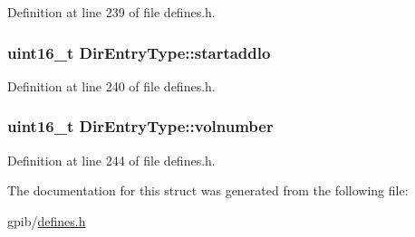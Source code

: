 Definition at line 239 of file defines.\+h.

\subsubsection[{\texorpdfstring{startaddlo}{startaddlo}}]{\setlength{\rightskip}{0pt plus 5cm}uint16\+\_\+t Dir\+Entry\+Type\+::startaddlo}\hypertarget{structDirEntryType_aea0e798bb172b4bddf174ce339a4a54a}{}\label{structDirEntryType_aea0e798bb172b4bddf174ce339a4a54a}


Definition at line 240 of file defines.\+h.

\subsubsection[{\texorpdfstring{volnumber}{volnumber}}]{\setlength{\rightskip}{0pt plus 5cm}uint16\+\_\+t Dir\+Entry\+Type\+::volnumber}\hypertarget{structDirEntryType_add9ab11f89586efb100471f6580e75c5}{}\label{structDirEntryType_add9ab11f89586efb100471f6580e75c5}


Definition at line 244 of file defines.\+h.



The documentation for this struct was generated from the following file\+:\begin{DoxyCompactItemize}
\item 
gpib/\hyperlink{defines_8h}{defines.\+h}\end{DoxyCompactItemize}
